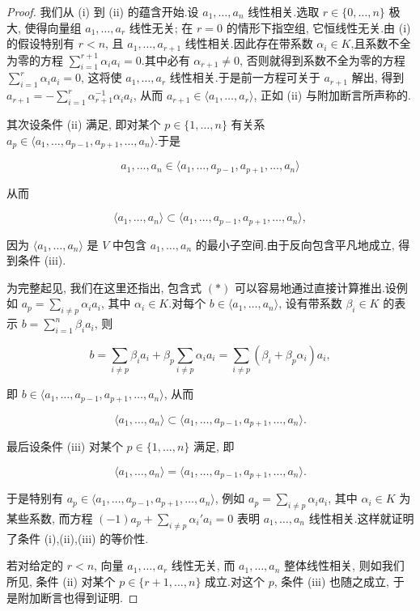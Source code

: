 \begin{proof}
我们从 (i) 到 (ii) 的蕴含开始.设 $a_1, \ldots, a_n$ 线性相关.选取 $r \in \{0, \ldots, n\}$ 极大, 使得向量组 $a_1, \ldots, a_r$ 线性无关; 在 $r = 0$ 的情形下指空组, 它恒线性无关.由 (i) 的假设特别有 $r < n$, 且 $a_1, \ldots, a_{r+1}$ 线性相关.因此存在带系数 $\alpha_i \in K$,且系数不全为零的方程 $\sum_{i = 1}^{r+1} \alpha_i a_i = 0$.其中必有 $\alpha_{r+1} \neq 0$, 否则就得到系数不全为零的方程 $\sum_{i = 1}^{r} \alpha_i a_i = 0$, 这将使 $a_1, \ldots, a_r$ 线性相关.于是前一方程可关于 $a_{r+1}$ 解出, 得到 $a_{r+1} = -\sum_{i = 1}^{r} \alpha_{r+1}^{-1} \alpha_i a_i$, 从而 $a_{r+1} \in \langle a_1, \ldots, a_r \rangle$, 正如 (ii) 与附加断言所声称的.

其次设条件 (ii) 满足, 即对某个 $p \in \{1, \ldots, n\}$ 有关系 $a_p \in \langle a_1, \ldots, a_{p-1}, a_{p+1}, \ldots, a_n \rangle$.于是

\[
a_1, \ldots, a_n \in \langle a_1, \ldots, a_{p-1}, a_{p+1}, \ldots, a_n \rangle
\]

从而

\[
\langle a_1, \ldots, a_n \rangle \subset \langle a_1, \ldots, a_{p-1}, a_{p+1}, \ldots, a_n \rangle,
\]

因为 $\langle a_1, \ldots, a_n \rangle$ 是 $V$ 中包含 $a_1, \ldots, a_n$ 的最小子空间.由于反向包含平凡地成立, 得到条件 (iii).

为完整起见, 我们在这里还指出, 包含式 $(*)$ 可以容易地通过直接计算推出.设例如 $a_p = \sum_{i \neq p} \alpha_i a_i$, 其中 $\alpha_i \in K$.对每个 $b \in \langle a_1, \ldots, a_n \rangle$, 设有带系数 $\beta_i \in K$ 的表示 $b = \sum_{i = 1}^{n} \beta_i a_i$, 则

\[
b = \sum_{i \neq p} \beta_i a_i + \beta_p \sum_{i \neq p} \alpha_i a_i = \sum_{i \neq p} (\beta_i + \beta_p \alpha_i) a_i,
\]

即 $b \in \langle a_1, \ldots, a_{p-1}, a_{p+1}, \ldots, a_n \rangle$, 从而

\[
\langle a_1, \ldots, a_n \rangle \subset \langle a_1, \ldots, a_{p-1}, a_{p+1}, \ldots, a_n \rangle\text{.}
\]

最后设条件 (iii) 对某个 $p \in \{1, \ldots, n\}$ 满足, 即

\[
\langle a_1, \ldots, a_n \rangle = \langle a_1, \ldots, a_{p-1}, a_{p+1}, \ldots, a_n \rangle\text{.}
\]

于是特别有 $a_p \in \langle a_1, \ldots, a_{p-1}, a_{p+1}, \ldots, a_n \rangle$, 例如 $a_p = \sum_{i \neq p} \alpha_i a_i$, 其中 $\alpha_i \in K$ 为某些系数, 而方程 $(-1)a_p + \sum_{i \neq p} \alpha_i' a_i = 0$ 表明 $a_1, \ldots, a_n$ 线性相关.这样就证明了条件 (i),(ii),(iii) 的等价性.

若对给定的 $r < n$, 向量 $a_1, \ldots, a_r$ 线性无关, 而 $a_1, \ldots, a_n$ 整体线性相关, 则如我们所见, 条件 (ii) 对某个 $p \in \{r + 1, \ldots, n\}$ 成立.对这个 $p$, 条件 (iii) 也随之成立, 于是附加断言也得到证明.
\end{proof}

